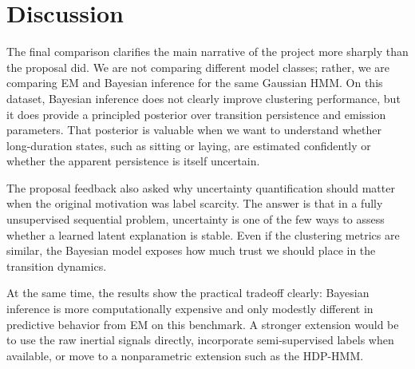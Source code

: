 \section{Discussion}
The final comparison clarifies the main narrative of the project more sharply than the proposal did. We are not comparing different model classes; rather, we are comparing EM and Bayesian inference for the same Gaussian HMM. On this dataset, Bayesian inference does not clearly improve clustering performance, but it does provide a principled posterior over transition persistence and emission parameters. That posterior is valuable when we want to understand whether long-duration states, such as sitting or laying, are estimated confidently or whether the apparent persistence is itself uncertain.

The proposal feedback also asked why uncertainty quantification should matter when the original motivation was label scarcity. The answer is that in a fully unsupervised sequential problem, uncertainty is one of the few ways to assess whether a learned latent explanation is stable. Even if the clustering metrics are similar, the Bayesian model exposes how much trust we should place in the transition dynamics.

At the same time, the results show the practical tradeoff clearly: Bayesian inference is more computationally expensive and only modestly different in predictive behavior from EM on this benchmark. A stronger extension would be to use the raw inertial signals directly, incorporate semi-supervised labels when available, or move to a nonparametric extension such as the HDP-HMM.
